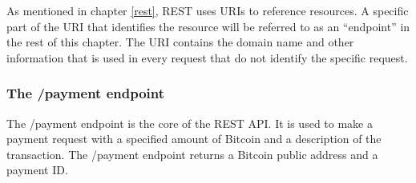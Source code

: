 




As mentioned in chapter \ref{rest}, REST uses URIs to reference resources. A specific part of the URI that identifies the resource will be referred to as an ``endpoint'' in the rest of this chapter. The URI contains the domain name and other information that is used in every request that do not identify the specific request.

\subsubsection{The /payment endpoint}
\label{sct:payment}

The /payment endpoint is the core of the REST API. It is used to make a payment request with a specified amount of Bitcoin and a description of the transaction. The /payment endpoint returns a Bitcoin public address and a payment ID. 

